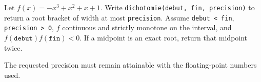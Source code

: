 Let $f(x)=-x^3+x^2+x+1$. Write \texttt{dichotomie(debut, fin, precision)} to return a root bracket of width at most \texttt{precision}. Assume \texttt{debut < fin}, \texttt{precision > 0}, $f$ continuous and strictly monotone on the interval, and $f(\texttt{debut})f(\texttt{fin})<0$. If a midpoint is an exact root, return that midpoint twice.

The requested precision must remain attainable with the floating-point numbers used.
